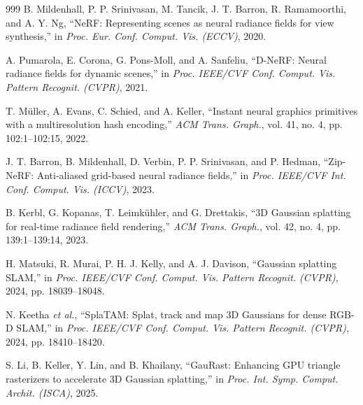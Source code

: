 \documentclass[11pt,a4paper]{article}
\begin{document}
\begin{thebibliography}{999}
B. Mildenhall, P. P. Srinivasan, M. Tancik, J. T. Barron, R. Ramamoorthi, and A. Y. Ng, ``NeRF: Representing scenes as neural radiance fields for view synthesis,'' in \textit{Proc. Eur. Conf. Comput. Vis. (ECCV)}, 2020.




A. Pumarola, E. Corona, G. Pons-Moll, and A. Sanfeliu, ``D-NeRF: Neural radiance fields for dynamic scenes,'' in \textit{Proc. IEEE/CVF Conf. Comput. Vis. Pattern Recognit. (CVPR)}, 2021.




T. M\"uller, A. Evans, C. Schied, and A. Keller, ``Instant neural graphics primitives with a multiresolution hash encoding,'' \textit{ACM Trans. Graph.}, vol. 41, no. 4, pp. 102:1--102:15, 2022.




J. T. Barron, B. Mildenhall, D. Verbin, P. P. Srinivasan, and P. Hedman, ``Zip-NeRF: Anti-aliased grid-based neural radiance fields,'' in \textit{Proc. IEEE/CVF Int. Conf. Comput. Vis. (ICCV)}, 2023.





B. Kerbl, G. Kopanas, T. Leimk\"{u}hler, and G. Drettakis, ``{3D} Gaussian splatting for real-time radiance field rendering,'' \textit{ACM Trans. Graph.}, vol. 42, no. 4, pp. 139:1--139:14, 2023.




H. Matsuki, R. Murai, P. H. J. Kelly, and A. J. Davison, ``Gaussian splatting {SLAM},'' in \textit{Proc. IEEE/CVF Conf. Comput. Vis. Pattern Recognit. (CVPR)}, 2024, pp. 18039--18048.




N. Keetha \textit{et al.}, ``{SplaTAM}: Splat, track and map {3D} Gaussians for dense {RGB-D SLAM},'' in \textit{Proc. IEEE/CVF Conf. Comput. Vis. Pattern Recognit. (CVPR)}, 2024, pp. 18410--18420.




S. Li, B. Keller, Y. Lin, and B. Khailany, ``{GauRast}: Enhancing {GPU} triangle rasterizers to accelerate {3D} Gaussian splatting,'' in \textit{Proc. Int. Symp. Comput. Archit. (ISCA)}, 2025.




\end{thebibliography}
\end{document}

